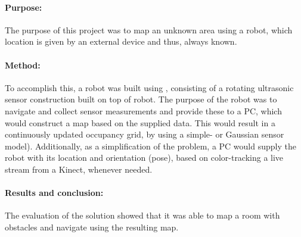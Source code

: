 \paragraph{Purpose:}The purpose of this project was to map an unknown area using a robot, which location is given by an external device and thus, always known.

\paragraph{Method:}To accomplish this, a robot was built using \legoms, consisting of a rotating ultrasonic sensor construction built on top of robot.
The purpose of the robot was to navigate and collect sensor measurements and provide these to a PC, which would construct a map based on the supplied data.
This would result in a continuously updated occupancy grid, by using a simple- or Gaussian sensor model).
Additionally, as a simplification of the problem, a PC would supply the robot with its location and orientation (pose), based on color-tracking a live stream from a Kinect, whenever needed.

\paragraph{Results and conclusion:}
The evaluation of the solution showed that it was able to map a room with obstacles and navigate using the resulting map.